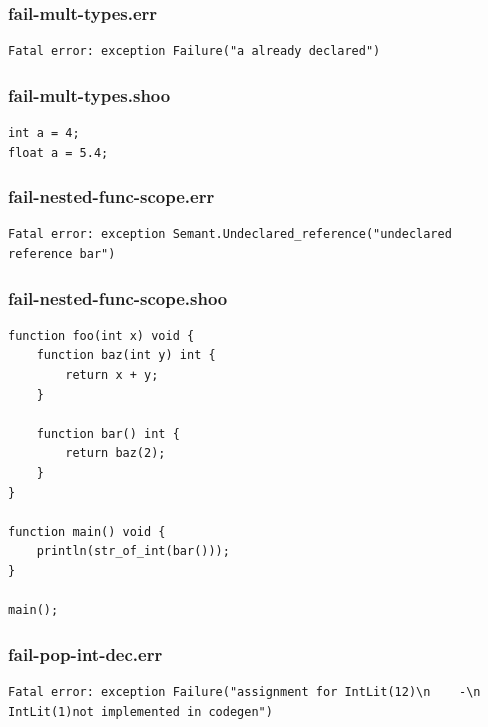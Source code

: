 \documentclass[12pt]{article}
\begin{document}
\subsubsection{fail-mult-types.err}
\begin{mdframed}[hidealllines=true,backgroundcolor=green!10]
\begin{lstlisting}
Fatal error: exception Failure("a already declared")\end{lstlisting}
\end{mdframed}
\subsubsection{fail-mult-types.shoo}
\begin{mdframed}[hidealllines=true,backgroundcolor=blue!10]
\begin{lstlisting}
int a = 4;
float a = 5.4;\end{lstlisting}
\end{mdframed}
\subsubsection{fail-nested-func-scope.err}
\begin{mdframed}[hidealllines=true,backgroundcolor=green!10]
\begin{lstlisting}
Fatal error: exception Semant.Undeclared_reference("undeclared reference bar")
\end{lstlisting}
\end{mdframed}
\subsubsection{fail-nested-func-scope.shoo}
\begin{mdframed}[hidealllines=true,backgroundcolor=blue!10]
\begin{lstlisting}
function foo(int x) void {
    function baz(int y) int {
        return x + y;
    }

    function bar() int {
        return baz(2);
    }
}

function main() void {
    println(str_of_int(bar()));
}

main();
\end{lstlisting}
\end{mdframed}
\subsubsection{fail-pop-int-dec.err}
\begin{mdframed}[hidealllines=true,backgroundcolor=green!10]
\begin{lstlisting}
Fatal error: exception Failure("assignment for IntLit(12)\n    -\n    IntLit(1)not implemented in codegen")
\end{lstlisting}
\end{mdframed}
\end{document}
